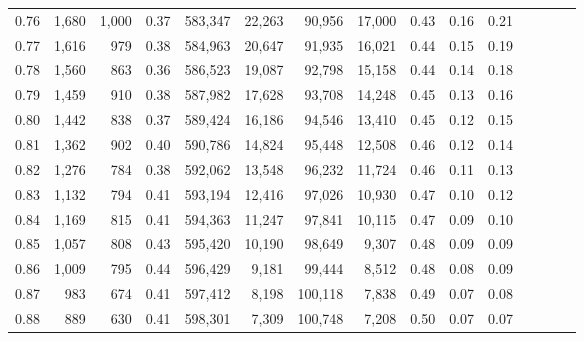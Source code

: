 \begin{tabular}{rrrcrrrrrrrrrrr}
0.76 &   1,680 &  1,000 &                                       0.37 &  583,347 &   22,263 &   90,956 &   17,000 &  0.43 &  0.16 &                         0.21 \\
0.77 &   1,616 &    979 &                                       0.38 &  584,963 &   20,647 &   91,935 &   16,021 &  0.44 &  0.15 &                         0.19 \\
0.78 &   1,560 &    863 &                                       0.36 &  586,523 &   19,087 &   92,798 &   15,158 &  0.44 &  0.14 &                         0.18 \\
0.79 &   1,459 &    910 &                                       0.38 &  587,982 &   17,628 &   93,708 &   14,248 &  0.45 &  0.13 &                         0.16 \\
0.80 &   1,442 &    838 &                                       0.37 &  589,424 &   16,186 &   94,546 &   13,410 &  0.45 &  0.12 &                         0.15 \\
0.81 &   1,362 &    902 &                                       0.40 &  590,786 &   14,824 &   95,448 &   12,508 &  0.46 &  0.12 &                         0.14 \\
0.82 &   1,276 &    784 &                                       0.38 &  592,062 &   13,548 &   96,232 &   11,724 &  0.46 &  0.11 &                         0.13 \\
0.83 &   1,132 &    794 &                                       0.41 &  593,194 &   12,416 &   97,026 &   10,930 &  0.47 &  0.10 &                         0.12 \\
0.84 &   1,169 &    815 &                                       0.41 &  594,363 &   11,247 &   97,841 &   10,115 &  0.47 &  0.09 &                         0.10 \\
0.85 &   1,057 &    808 &                                       0.43 &  595,420 &   10,190 &   98,649 &    9,307 &  0.48 &  0.09 &                         0.09 \\
0.86 &   1,009 &    795 &                                       0.44 &  596,429 &    9,181 &   99,444 &    8,512 &  0.48 &  0.08 &                         0.09 \\
0.87 &     983 &    674 &                                       0.41 &  597,412 &    8,198 &  100,118 &    7,838 &  0.49 &  0.07 &                         0.08 \\
0.88 &     889 &    630 &                                       0.41 &  598,301 &    7,309 &  100,748 &    7,208 &  0.50 &  0.07 &                         0.07 \\

\end{tabular}
